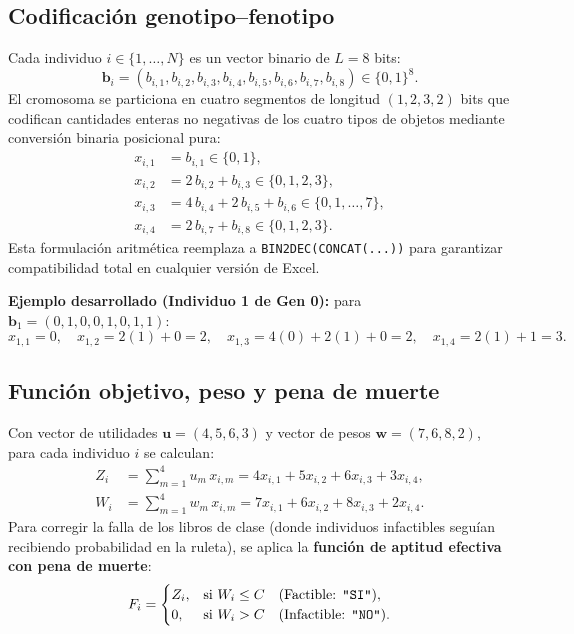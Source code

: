 \documentclass[11pt,a4paper]{article}
\begin{document}
\subsection{Codificaci\'on genotipo--fenotipo}

Cada individuo $i \in \{1,\dots,N\}$ es un vector binario de $L = 8$ bits:
\begin{equation}
\mathbf{b}_i = (b_{i,1}, b_{i,2}, b_{i,3}, b_{i,4}, b_{i,5}, b_{i,6}, b_{i,7}, b_{i,8}) \in \{0,1\}^8.
\end{equation}
El cromosoma se particiona en cuatro segmentos de longitud $(1, 2, 3, 2)$ bits que codifican cantidades enteras no negativas de los cuatro tipos de objetos mediante conversi\'on binaria posicional pura:
\begin{align}
x_{i,1} &= b_{i,1} \in \{0, 1\}, \\
x_{i,2} &= 2\,b_{i,2} + b_{i,3} \in \{0, 1, 2, 3\}, \\
x_{i,3} &= 4\,b_{i,4} + 2\,b_{i,5} + b_{i,6} \in \{0, 1, \dots, 7\}, \\
x_{i,4} &= 2\,b_{i,7} + b_{i,8} \in \{0, 1, 2, 3\}.
\end{align}
Esta formulaci\'on aritm\'etica reemplaza a \texttt{BIN2DEC(CONCAT(...))} para garantizar compatibilidad total en cualquier versi\'on de Excel.

\textbf{Ejemplo desarrollado (Individuo 1 de Gen 0):} para $\mathbf{b}_1 = (0, 1, 0, 0, 1, 0, 1, 1)$:
\[
x_{1,1} = 0,\quad x_{1,2} = 2(1)+0 = 2,\quad x_{1,3} = 4(0)+2(1)+0 = 2,\quad x_{1,4} = 2(1)+1 = 3.
\]

\subsection{Funci\'on objetivo, peso y pena de muerte}

Con vector de utilidades $\mathbf{u} = (4, 5, 6, 3)$ y vector de pesos $\mathbf{w} = (7, 6, 8, 2)$, para cada individuo $i$ se calculan:
\begin{align}
Z_i &= \sum_{m=1}^{4} u_m\,x_{i,m} = 4x_{i,1} + 5x_{i,2} + 6x_{i,3} + 3x_{i,4}, \\
W_i &= \sum_{m=1}^{4} w_m\,x_{i,m} = 7x_{i,1} + 6x_{i,2} + 8x_{i,3} + 2x_{i,4}.
\end{align}
Para corregir la falla de los libros de clase (donde individuos infactibles segu\'ian recibiendo probabilidad en la ruleta), se aplica la \textbf{funci\'on de aptitud efectiva con pena de muerte}:
\begin{equation}
F_i = \begin{cases}
Z_i, & \text{si } W_i \le C \quad (\text{Factible: \texttt{"SI"}}), \\
0, & \text{si } W_i > C \quad (\text{Infactible: \texttt{"NO"}}).
\end{cases}
\end{equation}
\end{document}
